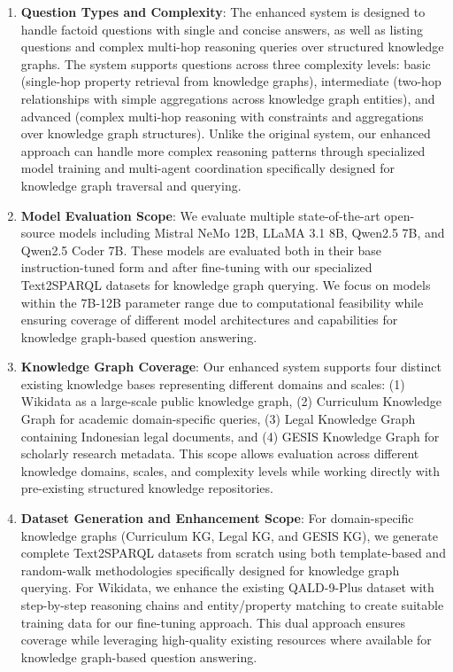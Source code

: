 \begin{enumerate}
    \item \textbf{Question Types and Complexity}: The enhanced system is designed to handle factoid questions with single and concise answers, as well as listing questions and complex multi-hop reasoning queries over structured knowledge graphs. The system supports questions across three complexity levels: basic (single-hop property retrieval from knowledge graphs), intermediate (two-hop relationships with simple aggregations across knowledge graph entities), and advanced (complex multi-hop reasoning with constraints and aggregations over knowledge graph structures). Unlike the original system, our enhanced approach can handle more complex reasoning patterns through specialized model training and multi-agent coordination specifically designed for knowledge graph traversal and querying.
    
    \item \textbf{Model Evaluation Scope}: We evaluate multiple state-of-the-art open-source models including Mistral NeMo 12B, LLaMA 3.1 8B, Qwen2.5 7B, and Qwen2.5 Coder 7B. These models are evaluated both in their base instruction-tuned form and after fine-tuning with our specialized Text2SPARQL datasets for knowledge graph querying. We focus on models within the 7B-12B parameter range due to computational feasibility while ensuring coverage of different model architectures and capabilities for knowledge graph-based question answering.
    
    \item \textbf{Knowledge Graph Coverage}: Our enhanced system supports four distinct existing knowledge bases representing different domains and scales: (1) Wikidata as a large-scale public knowledge graph, (2) Curriculum Knowledge Graph for academic domain-specific queries, (3) Legal Knowledge Graph containing Indonesian legal documents, and (4) GESIS Knowledge Graph for scholarly research metadata. This scope allows evaluation across different knowledge domains, scales, and complexity levels while working directly with pre-existing structured knowledge repositories.
    
    \item \textbf{Dataset Generation and Enhancement Scope}: For domain-specific knowledge graphs (Curriculum KG, Legal KG, and GESIS KG), we generate complete Text2SPARQL datasets from scratch using both template-based and random-walk methodologies specifically designed for knowledge graph querying. For Wikidata, we enhance the existing QALD-9-Plus dataset with step-by-step reasoning chains and entity/property matching to create suitable training data for our fine-tuning approach. This dual approach ensures coverage while leveraging high-quality existing resources where available for knowledge graph-based question answering.
    

\end{enumerate}
